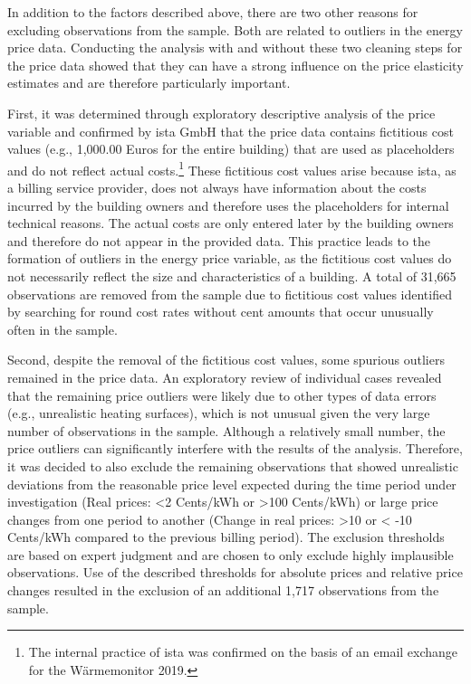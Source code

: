 \documentclass[12pt,twoside]{reedthesis}
\begin{document}
In addition to the factors described above, there are two other reasons for excluding observations from the sample. Both are related to outliers in the energy price data. Conducting the analysis with and without these two cleaning steps for the price data showed that they can have a strong influence on the price elasticity estimates and are therefore particularly important.

First, it was determined through exploratory descriptive analysis of the price variable and confirmed by ista GmbH that the price data contains fictitious cost values (e.g., 1,000.00 Euros for the entire building) that are used as placeholders and do not reflect actual costs.\footnote{The internal practice of ista was confirmed on the basis of an email exchange for the Wärmemonitor 2019.} These fictitious cost values arise because ista, as a billing service provider, does not always have information about the costs incurred by the building owners and therefore uses the placeholders for internal technical reasons. The actual costs are only entered later by the building owners and therefore do not appear in the provided data. This practice leads to the formation of outliers in the energy price variable, as the fictitious cost values do not necessarily reflect the size and characteristics of a building. A total of 31,665 observations are removed from the sample due to fictitious cost values identified by searching for round cost rates without cent amounts that occur unusually often in the sample.

Second, despite the removal of the fictitious cost values, some spurious outliers remained in the price data. An exploratory review of individual cases revealed that the remaining price outliers were likely due to other types of data errors (e.g., unrealistic heating surfaces), which is not unusual given the very large number of observations in the sample. Although a relatively small number, the price outliers can significantly interfere with the results of the analysis. Therefore, it was decided to also exclude the remaining observations that showed unrealistic deviations from the reasonable price level expected during the time period under investigation (Real prices: \textless2 Cents/kWh or \textgreater100 Cents/kWh) or large price changes from one period to another (Change in real prices: \textgreater10 or \textless{} -10 Cents/kWh compared to the previous billing period). The exclusion thresholds are based on expert judgment and are chosen to only exclude highly implausible observations. Use of the described thresholds for absolute prices and relative price changes resulted in the exclusion of an additional 1,717 observations from the sample.
\end{document}
